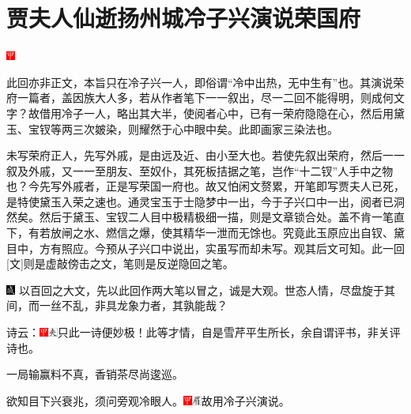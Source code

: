 

\chapter{贾夫人仙逝扬州城\hspace{.5em}冷子兴演说荣国府}
\includegraphics[width=3mm]{../Images/00002}{\kaishu 此回亦非正文，本旨只在冷子兴一人，即俗谓``冷中出热，无中生有''也。其演说荣府一篇者，盖因族大人多，若从作者笔下一一叙出，尽一二回不能得明，则成何文字？故借用冷子一人，略出其大半，使阅者心中，已有一荣府隐隐在心，然后用黛玉、宝钗等两三次皴染，则耀然于心中眼中矣。此即画家三染法也。


未写荣府正人，先写外戚，是由远及近、由小至大也。若使先叙出荣府，然后一一叙及外戚，又一一至朋友、至奴仆，其死板拮据之笔，岂作``十二钗''人手中之物也？今先写外戚者，正是写荣国一府也。故又怕闲文赘累，开笔即写贾夫人已死，是特使黛玉入荣之速也。通灵宝玉于士隐梦中一出，今于子兴口中一出，阅者已洞然矣。然后于黛玉、宝钗二人目中极精极细一描，则是文章锁合处。盖不肯一笔直下，有若放闸之水、燃信之爆，使其精华一泄而无馀也。究竟此玉原应出自钗、黛目中，方有照应。今预从子兴口中说出，实虽写而却未写。观其后文可知。此一回{[}文{]}则是虚敲傍击之文，笔则是反逆隐回之笔。

\includegraphics[width=3mm]{../Images/00005}  \kaishu 以百回之大文，先以此回作两大笔以冒之，诚是大观。世态人情，尽盘旋于其间，而一丝不乱，非具龙象力者，其孰能哉？}

诗云：{\includegraphics[width=3mm]{../Images/00002}\includegraphics[width=3mm]{../Images/00012}\footnotesize \kaishu 只此一诗便妙极！此等才情，自是雪芹平生所长，余自谓评书，非关评诗也。}

一局输赢料不真，香销茶尽尚逡巡。

欲知目下兴衰兆，须问旁观冷眼人。{\includegraphics[width=3mm]{../Images/00002}\includegraphics[width=3mm]{../Images/00010}\footnotesize \kaishu 故用冷子兴演说。}

